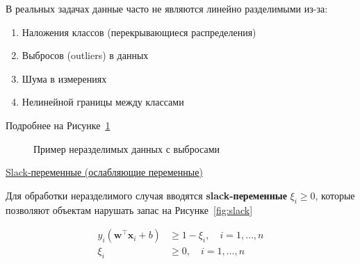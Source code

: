 В реальных задачах данные часто не являются линейно разделимыми из-за:
\begin{enumerate}
    \item Наложения классов (перекрывающиеся распределения)
    \item Выбросов (outliers) в данных
    \item Шума в измерениях
    \item Нелинейной границы между классами
\end{enumerate}
Подробнее на Рисунке~\ref{fig:unsep}
\begin{figure}[h]
    \centering
    \caption{Пример неразделимых данных с выбросами}
    \label{fig:unsep}
\end{figure}

\underline{Slack-переменные (ослабляющие переменные)}

Для обработки неразделимого случая вводятся \textbf{slack-переменные} $\xi_i \geq 0$, которые позволяют объектам
нарушать запас на Рисунке~\ref{fig:slack}

\begin{align*}
    y_i(\bm{w}^\top \bm{x}_i + b) &\geq 1 - \xi_i, \quad i = 1, \dots, n \\
    \xi_i &\geq 0, \quad i = 1, \dots, n
\end{align*}

